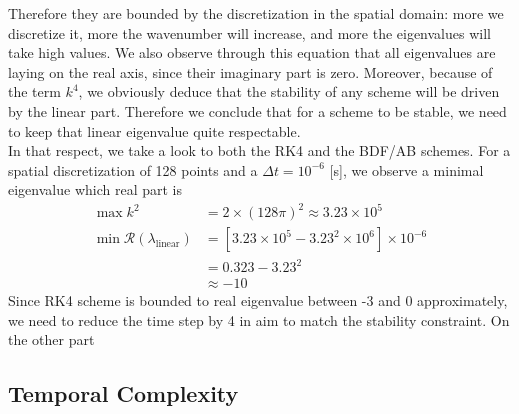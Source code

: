 \documentclass[10pt,a4paper,twocolumn]{article}
\begin{document}
Therefore they are bounded by the discretization in the spatial domain: more we discretize it, more the wavenumber will increase, and more the eigenvalues will take high values. We also observe through this equation that all eigenvalues are laying on the real axis, since their imaginary part is zero. Moreover, because of the term $k^4$, we obviously deduce that the stability of any scheme will be driven by the linear part. Therefore we conclude that for a scheme to be stable, we need to keep that linear eigenvalue quite respectable.
\vspace{\baselineskip}\\
In that respect, we take a look to both the RK4 and the BDF/AB schemes. For a spatial discretization of 128 points and a $\Delta t = 10^{-6}$ [s], we observe a minimal eigenvalue which real part is
\begin{align*}
	\max k^2 &= 2\times(128\pi)^2 \approx 3.23\times10^5 \\
	\min \mathcal R (\lambda_\text{linear}) &= \left[ 3.23\times10^5 - 3.23^2\times10^6 \right]\times10^{-6} \\
	&= 0.323 - 3.23^2 \\
	&\approx -10
\end{align*}
Since RK4 scheme is bounded to real eigenvalue between -3 and 0 approximately, we need to reduce the time step by 4 in aim to match the stability constraint. On the other part

\subsection{Temporal Complexity} %
\label{sub:temporal_complexity}
\end{document}
